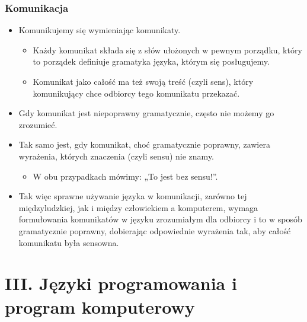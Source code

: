 \documentclass{beamer}
\begin{document}
\begin{frame}[fragile]
\frametitle{Komunikacja}
\begin{itemize}
\item Komunikujemy się wymieniając komunikaty.
	\begin{itemize}
	\item Każdy komunikat składa się z słów ułożonych w pewnym porządku, który to porządek definiuje gramatyka języka, którym się posługujemy.
	\item Komunikat jako całość ma też swoją treść (czyli sens), który komunikujący chce odbiorcy tego komunikatu przekazać.
	\end{itemize}
\item Gdy komunikat jest niepoprawny gramatycznie, często nie możemy go zrozumieć. 
\item Tak samo jest, gdy komunikat, choć gramatycznie poprawny, zawiera wyrażenia, których znaczenia (czyli sensu) nie znamy. 
	\begin{itemize}
	\item W obu przypadkach mówimy: „To jest bez sensu!”.
	\end{itemize}
\item Tak więc sprawne używanie języka w komunikacji, zarówno tej międzyludzkiej, jak i między człowiekiem a komputerem, wymaga formułowania komunikatów w języku zrozumiałym dla odbiorcy i to w sposób gramatycznie poprawny, dobierając odpowiednie wyrażenia tak, aby całość komunikatu była sensowna. 
\end{itemize}

\end{frame}

\section{III. Języki programowania i program komputerowy}
\end{document}
